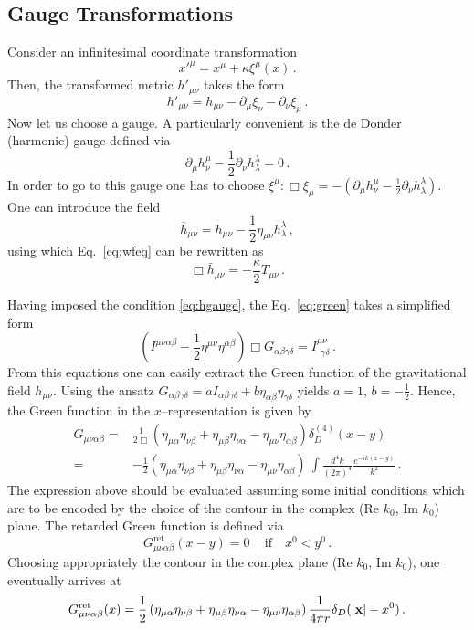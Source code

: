 \documentclass[11pt,a4paper]{article}
\newcommand{\be}{\begin{equation}}
\newcommand{\ee}{\end{equation}}
\newcommand\m{\mu}
\newcommand\n{\nu}
\renewcommand\a{\alpha}
\renewcommand\b{\beta}
\renewcommand\l{\lambda}
\def\d{\partial}
\begin{document}
\subsection{Gauge Transformations}
\label{sec:gauge}

Consider an infinitesimal coordinate transformation
\be
x'^\m=x^\m+\kappa \xi^\m(x)\,.
\ee
Then, the transformed metric $h'_{\m\n}$ takes the form
\be
h'_{\m\n}=h_{\m \n}-\d_\m\xi_\n-\d_\n \xi_\m\,.
\ee
Now let us choose a gauge. A particularly convenient is the de Donder (harmonic) gauge defined via
\be
\label{eq:dedon}
\d_\m h^\m_\n-\frac{1}{2}\d_\n h^\l_\l=0\,.
\ee
In order to go to this gauge one has to choose $\xi^\m:\Box \xi_\m=-(\d_\m h^\m_\n-\frac{1}{2}\d_\n h^\l_\l)$.
One can introduce the field
\be
\label{eq:hgauge}
\bar h_{\m \n}= h_{\m \n}-\frac{1}{2}\eta_{\m \n}h^\l_\l\,,
\ee
using which Eq.~\eqref{eq:wfeq} can be rewritten as
\be
\Box\bar h_{\m\n} =-\frac{\kappa}{2}T_{\m\n}\,.
\ee

Having imposed the condition
\eqref{eq:hgauge}, the Eq.~\eqref{eq:green} takes a simplified form
\begin{equation}
 \left(I^{\mu\nu\alpha\beta}-\dfrac{1}{2}\eta^{\mu\nu}\eta^{\alpha\beta}\right)\Box  G_{\alpha\beta\gamma\delta}=I^{\mu\nu}_{~~\gamma\delta}\,.
\end{equation}
From this equations
one can easily extract the Green function of the gravitational field $h_{\mu\nu}$.
Using the ansatz $G_{\alpha\beta\gamma\delta}=aI_{\alpha\beta\gamma\delta}+b\eta_{\alpha\beta}\eta_{\gamma\delta}$ yields $a=1$, $b=-\frac{1}{2}$. Hence, the Green function in the $x$--representation is given by
\be
\label{eq:greenfinal}
\begin{split}
G_{\m\n\a\b}=&\frac{1}{2\Box}\left(\eta_{\m\a}\eta_{\n\b}+\eta_{\m\b}\eta_{\n\a}-\eta_{\m\n}\eta_{\a\b}\right)\delta^{(4)}_{D}(x-y)\\
=&-\frac{1}{2}\left(\eta_{\m\a}\eta_{\n\b}+\eta_{\m\b}\eta_{\n\a}-\eta_{\m\n}\eta_{\a\b}\right)\
\int \frac{d^4 k}{(2\pi)^4}\frac{e^{-ik(x-y)}}{k^2}\,.
\end{split}
\ee
The expression above should be evaluated assuming some initial conditions which are to be encoded by
the choice of the contour in the complex (Re $k_0$, Im $k_0$) plane.
The retarded Green function is defined via
\be
 G^{\text{ret}}_{\m\n\a\b}(x-y)=0\,\quad \text{if}\quad x^0<y^0\,.
\ee
Choosing appropriately the contour in the complex plane (Re $k_0$, Im $k_0$), one eventually arrives at
\be
 G^{\text{ret}}_{\m\n\a\b}(x)=\frac{1}{2}\left(\eta_{\m\a}\eta_{\n\b}+\eta_{\m\b}\eta_{\n\a}-\eta_{\m\n}\eta_{\a\b}\right)
 \frac{1}{4\pi r}\delta_D(|{\bf x}|-x^0)\,.
\ee
\end{document}

